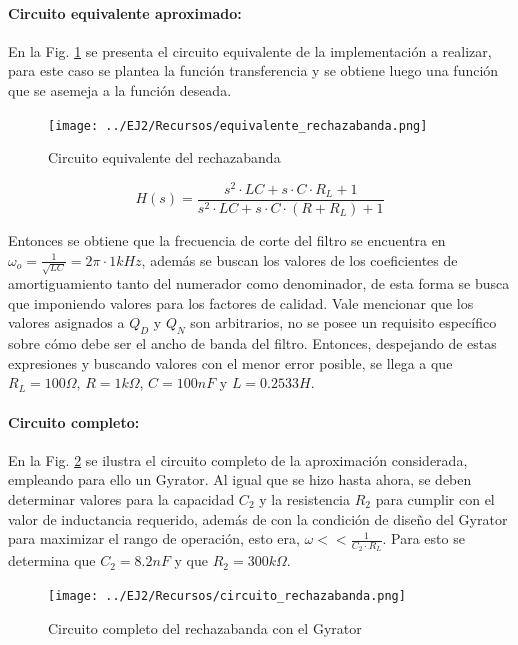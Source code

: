 \paragraph*{Circuito equivalente aproximado:} En la Fig. \ref{fig:equivalente_rechazabanda} se presenta el circuito equivalente de la implementaci\'on a realizar, para este caso se plantea la funci\'on transferencia y se obtiene luego
una funci\'on que se asemeja a la funci\'on deseada. 

\begin{figure}[H]
    \centering
    \texttt{[image: ../EJ2/Recursos/equivalente\_rechazabanda.png]}
    \caption{Circuito equivalente del rechazabanda}
    \label{fig:equivalente_rechazabanda}
\end{figure}

\begin{equation}
    H(s) = \frac{s^{2} \cdot LC + s \cdot C \cdot R_L + 1}{s^{2} \cdot LC + s \cdot C \cdot (R + R_L) + 1}    
\end{equation}

Entonces se obtiene que la frecuencia de corte del filtro se encuentra en $\omega_o = \frac{1}{\sqrt{LC}} = 2\pi \cdot 1kHz$, adem\'as se buscan los valores de los coeficientes de amortiguamiento tanto del numerador como denominador,
de esta forma se busca que imponiendo valores para los factores de calidad. Vale mencionar que los valores asignados a $Q_D$ y $Q_N$ son arbitrarios, no se posee un requisito espec\'ifico sobre c\'omo debe ser el ancho de banda del filtro.
Entonces, despejando de estas expresiones y buscando valores con el menor error posible, se llega a que $R_L = 100 \Omega$, $R = 1k \Omega$, $C = 100nF$ y $L = 0.2533H$.

\paragraph*{Circuito completo:} En la Fig. \ref{fig:circuito_rechazabanda} se ilustra el circuito completo de la aproximaci\'on considerada, empleando para ello un Gyrator. Al igual que se hizo hasta ahora,
se deben determinar valores para la capacidad $C_2$ y la resistencia $R_2$ para cumplir con el valor de inductancia requerido, adem\'as de con la condici\'on de dise\~no del Gyrator para maximizar el rango de operaci\'on, esto era,
$\omega << \frac{1}{C_2 \cdot R_L}$. Para esto se determina que $C_2 = 8.2nF$ y que $R_2 = 300k\Omega$.

\begin{figure}[H]
    \centering
    \texttt{[image: ../EJ2/Recursos/circuito\_rechazabanda.png]}
    \caption{Circuito completo del rechazabanda con el Gyrator}
    \label{fig:circuito_rechazabanda}
\end{figure}


